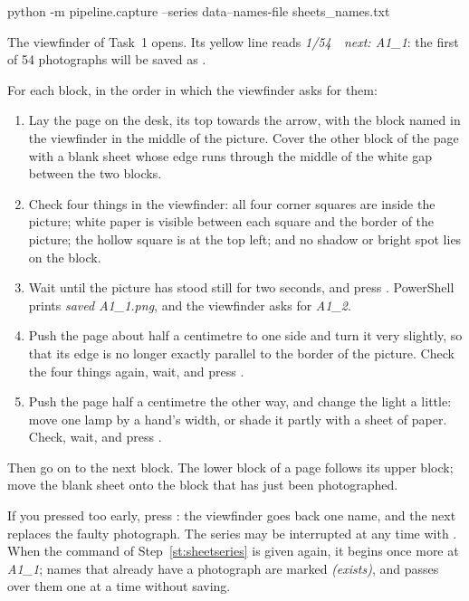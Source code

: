 

\label{st:sheetseries}
\begin{ps}
python -m pipeline.capture --series data\sheets --names-file sheets\photo_names.txt
\end{ps}
The viewfinder of Task~1 opens. Its yellow line reads \emph{1/54\ \ next: A1\_1}: the first of
54 photographs will be saved as .

\label{st:oneblock}
For each block, in the order in which the viewfinder asks for them:
\begin{enumerate}
\item Lay the page on the desk, its top towards the arrow, with the block named in the
  viewfinder in the middle of the picture. Cover the other block of the page with a blank sheet
  whose edge runs through the middle of the white gap between the two blocks.
\item Check four things in the viewfinder: all four corner squares are inside the picture;
  white paper is visible between each square and the border of the picture; the hollow square
  is at the top left; and no shadow or bright spot lies on the block.
\item Wait until the picture has stood still for two seconds, and press . PowerShell
  prints \emph{saved A1\_1.png}, and the viewfinder asks for \emph{A1\_2}.
\item Push the page about half a centimetre to one side and turn it very slightly, so that its
  edge is no longer exactly parallel to the border of the picture. Check the four things again,
  wait, and press .
\item Push the page half a centimetre the other way, and change the light a little: move one
  lamp by a hand's width, or shade it partly with a sheet of paper. Check, wait, and press
  .
\end{enumerate}
Then go on to the next block. The lower block of a page follows its upper block; move the blank
sheet onto the block that has just been photographed.

\begin{note}
If you pressed  too early, press : the viewfinder goes back one name, and the
next  replaces the faulty photograph. The series may be interrupted at any time with
. When the command of Step~\ref{st:sheetseries} is given again, it begins once more at
\emph{A1\_1}; names that already have a photograph are marked \emph{(exists)}, and 
passes over them one at a time without saving.
\end{note}

